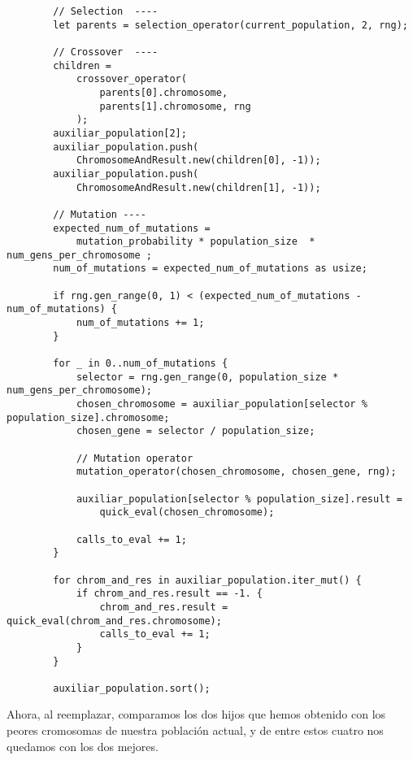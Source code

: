 \documentclass[size=a4, parskip=half, titlepage=false, toc=flat, toc=bib, 12pt]{scrartcl}
\begin{document}
\begin{verbatim}
        // Selection  ----
        let parents = selection_operator(current_population, 2, rng);

        // Crossover  ----
        children =
            crossover_operator(
                parents[0].chromosome,
                parents[1].chromosome, rng
            );
        auxiliar_population[2];
        auxiliar_population.push(
            ChromosomeAndResult.new(children[0], -1));
        auxiliar_population.push(
            ChromosomeAndResult.new(children[1], -1));

        // Mutation ----
        expected_num_of_mutations =
            mutation_probability * population_size  * num_gens_per_chromosome ;
        num_of_mutations = expected_num_of_mutations as usize;

        if rng.gen_range(0, 1) < (expected_num_of_mutations - num_of_mutations) {
            num_of_mutations += 1;
        }

        for _ in 0..num_of_mutations {
            selector = rng.gen_range(0, population_size * num_gens_per_chromosome);
            chosen_chromosome = auxiliar_population[selector % population_size].chromosome;
            chosen_gene = selector / population_size;

            // Mutation operator
            mutation_operator(chosen_chromosome, chosen_gene, rng);

            auxiliar_population[selector % population_size].result =
                quick_eval(chosen_chromosome);

            calls_to_eval += 1;
        }

        for chrom_and_res in auxiliar_population.iter_mut() {
            if chrom_and_res.result == -1. {
                chrom_and_res.result = quick_eval(chrom_and_res.chromosome);
                calls_to_eval += 1;
            }
        }

        auxiliar_population.sort();
\end{verbatim}
Ahora, al reemplazar, comparamos los dos hijos que hemos obtenido con los peores cromosomas de nuestra población actual, y de entre estos cuatro nos quedamos con los dos mejores.
\end{document}
